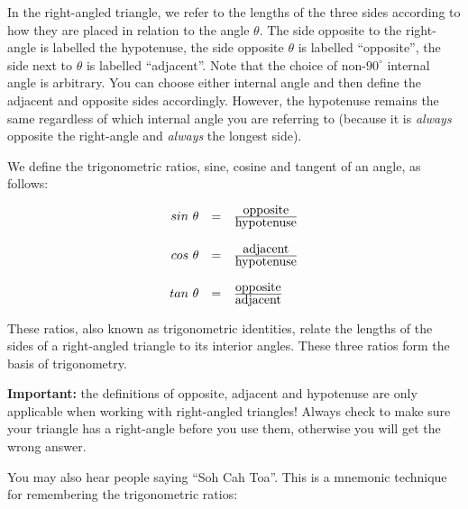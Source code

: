 

In the right-angled triangle, we refer to the lengths of the three
sides according to how they are placed in relation to the angle
$\theta $. The side opposite to the right-angle is labelled the
hypotenuse, the side opposite $\theta $ is labelled ``opposite'', the
side next to $\theta $ is labelled ``adjacent''. Note that the choice
of non-$90^{\circ}$ internal angle is arbitrary. You can choose either
internal angle and then define the adjacent and opposite sides
accordingly. However, the hypotenuse remains the same regardless of
which internal angle you are referring to (because it is {\em always}
opposite the right-angle and {\em always} the longest side).

We define the trigonometric ratios, sine, cosine and tangent of an
angle, as follows:

\begin{equation*}
\begin{array}{ccc}\hfill sin~ \theta & =& \frac{\mbox{opposite}}{\mbox{hypotenuse}}\hfill \\
\\
 \hfill cos~ \theta & =& \frac{\mbox{adjacent}}{\mbox{hypotenuse}}\hfill \\
\\
 \hfill tan~ \theta & =& \frac{\mbox{opposite}}{\mbox{adjacent}}\hfill 
\end{array}
\end{equation*}

These ratios, also known as trigonometric identities, relate the
lengths of the sides of a right-angled triangle to its interior
angles. These three ratios form the basis of trigonometry.

\par
\textbf{Important:} the definitions of opposite, adjacent and hypotenuse are only applicable when working with right-angled triangles! Always check to make sure your triangle has a right-angle before you use them, otherwise you will get the wrong answer.
\par
You may also hear people saying ``Soh Cah Toa''. This is a mnemonic
technique for remembering the trigonometric ratios:


